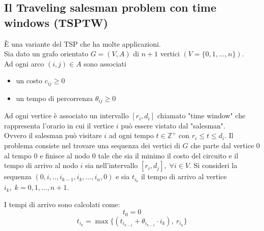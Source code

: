 \subsection{Il Traveling salesman problem con time windows (TSPTW)}
È una variante del TSP che ha molte applicazioni.\\
Sia dato un grafo orientato $G=(V,A)$ di $n+1$ vertici $(V=\{0,1,\dots,n\})$.\\
Ad ogni arco $(i,j)\in A$ sono associati
\begin{itemize}
	\item un costo $c_{ij} \ge 0$
	\item un tempo di percorrenza $\theta_{ij}\ge 0$
\end{itemize}
Ad ogni vertice è associato un intervallo $[r_{i},d_{i}]$ chiamato "time window" che rappresenta l'orario in cui il vertice $i$ può essere vistato dal "salesman".\\
Ovvero il salesman può visitare $i$ ad ogni tempo $t\in \mathbb{Z}^{+}$ con $r_{i}\le t\le d_{i}$.\newline
Il problema consiste nel trovare una sequenza dei vertici di $G$ che parte dal vertice $0$ al tempo $0$ e finisce al nodo $0$ tale che sia il minimo il costo del circuito e il tempo di arrivo al nodo $i$ sia nell'intervallo $[r_{i},d_{j}],\;\forall i\in V$.\newline
Si consideri la sequenza $(0,i,..,i_{k-1},i_{k},\dots,i_{n},0)$ e sia $t_{i_{k}}$ il tempo di arrivo al vertice $i_{k},\; k=0,1,\dots,n+1$.

I tempi di arrivo sono calcolati come:
\begin{equation}
	t_{0}=0
\end{equation}
\begin{equation}
	t_{i_{k}}=\max \{(t_{i_{k-1}}+\theta_{i_{k-1}}\cdot i_{k}),\ r_{i_{k}}\}
\end{equation}

